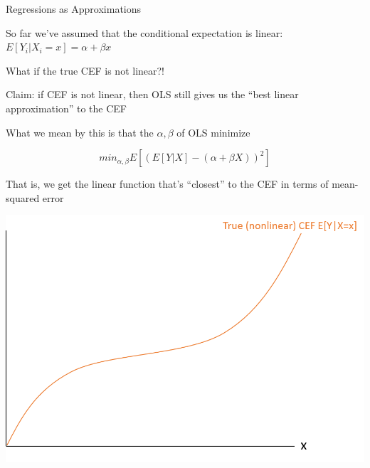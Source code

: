 \documentclass[11pt,english,handout]{beamer}
\newenvironment{wideitemize}{\itemize\addtolength{\itemsep}{10pt}}{\enditemize}
\begin{document}
\begin{frame}{Regressions as Approximations}
	\begin{wideitemize}
	\item
	So far we've assumed that the conditional expectation is linear: $E[Y_i | X_i = x]  = \alpha + \beta x$
	
	\item
	What if the true CEF is not linear?!
	
	\pause
	\item
	Claim: if CEF is not linear, then OLS still gives us the ``best linear approximation'' to the CEF 
	\pause 
	\item
	 What we mean by this is that the $\alpha,\beta$ of OLS minimize
	 
	 $$min_{\alpha,\beta} E[ (E[Y|X]  - (\alpha + \beta X) )^2 ]$$
	 
	 \pause
	 That is, we get the linear function that's ``closest'' to the CEF in terms of mean-squared error
	\end{wideitemize}
\end{frame}


\begin{frame}
		
	\begin{center}
		\hspace{0.7cm}\includegraphics[scale=0.7]{ols1.png}
	\end{center}
	
\end{frame}
\end{document}
